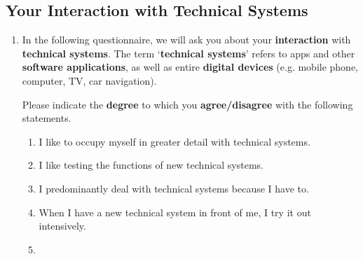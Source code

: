 \subsection{Your Interaction with Technical Systems}
\label{xhw_study::subapp::ati}
\begin{enumerate}
    \setcounter{enumi}{\value{qcounter}}
    \item \label{xhw_study::question::ati} 
        In the following questionnaire, we will ask you about your \textbf{interaction} with \textbf{technical systems}. The term ‘\textbf{technical systems}’ refers to apps and other \textbf{software applications}, as well as entire \textbf{digital devices} (e.g. mobile phone, computer, TV, car navigation).
        
        Please indicate the \textbf{degree} to which you \textbf{agree/disagree} with the following statements.
    \begin{enumerate}
        \item \label{xhw_study::question::ati_q0}
            I like to occupy myself in greater detail with technical systems.
        \item \label{xhw_study::question::ati_q1}
            I like testing the functions of new technical systems.
        \item \label{xhw_study::question::ati_q2}
            I predominantly deal with technical systems because I have to.
        \item \label{xhw_study::question::ati_q3}
            When I have a new technical system in front of me, I try it out intensively.
        \item \label{xhw_study::question::ati_q4}

\end{enumerate}
\end{enumerate}
